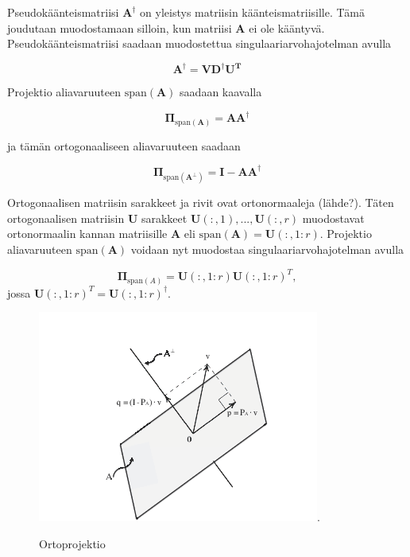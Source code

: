 Pseudokäänteismatriisi $\mathbf{A^{\dagger}}$ on yleistys matriisin käänteismatriisille. Tämä joudutaan muodostamaan silloin, kun matriisi $\mathbf{A}$ ei ole kääntyvä. Pseudokäänteismatriisi saadaan muodostettua singulaariarvohajotelman avulla

\begin{equation}
    \mathbf{A^{\dagger} = VD^{\dagger}U^T}
\end{equation}

Projektio aliavaruuteen $\text{span}(\mathbf{A})$ saadaan kaavalla

\begin{equation}
    \mathbf{\Pi}_{\text{span}(\mathbf{A})}= \mathbf{AA}^{\dagger}
\end{equation}

ja tämän ortogonaaliseen aliavaruuteen saadaan

\begin{equation}
    \mathbf{\Pi}_{\text{span}(\mathbf{A}^{\bot})}=\mathbf{I}-\mathbf{AA}^{\dagger}
\end{equation}

Ortogonaalisen matriisin sarakkeet ja rivit ovat ortonormaaleja (lähde?). Täten ortogonaalisen matriisin \textbf{U} sarakkeet $\mathbf{U}(:,1),...,\mathbf{U}(:,r)$ muodostavat ortonormaalin kannan matriisille \textbf{A} eli $\text{span}(\mathbf{A}) = \mathbf{U}(:,1:r)$. Projektio aliavaruuteen $\text{span}(\mathbf{A})$ voidaan nyt muodostaa singulaariarvohajotelman avulla

\begin{equation}
    \mathbf{\Pi}_{\text{span}(A)} = \mathbf{U}(:,1:r)\mathbf{U}(:,1:r)^T,
    \label{eq:6}
\end{equation}
jossa $\mathbf{U}(:,1:r)^T = \mathbf{U}(:,1:r)^{\dagger}$.

\begin{figure}[h]
    \centering
    \includegraphics[width=.7\textwidth]{ortoprojektio.png}.
    \caption{Ortoprojektio}
\end{figure}